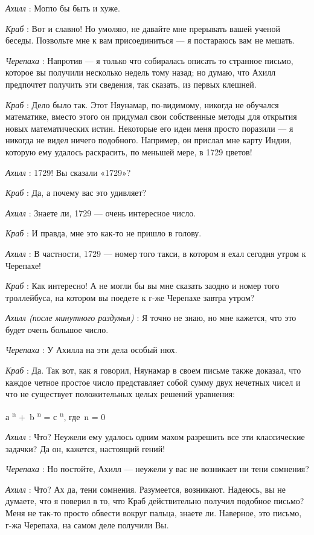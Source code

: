 \documentclass[../main.tex]{subfiles}
\begin{document}
\begin{dialogue}
\emph{Ахилл} : Могло бы быть и хуже.

\emph{Краб} : Вот и славно! Но умоляю, не давайте мне прерывать вашей ученой беседы. Позвольте мне к вам присоединиться --- я постараюсь вам не мешать.

\emph{Черепаха} : Напротив --- я только что собиралась описать то странное письмо, которое вы получили несколько недель тому назад; но думаю, что Ахилл предпочтет получить эти сведения, так сказать, из первых клешней.

\emph{Краб} : Дело было так. Этот Няунамар, по-видимому, никогда не обучался математике, вместо этого он придумал свои собственные методы для открытия новых математических истин. Некоторые его идеи меня просто поразили --- я никогда не видел ничего подобного. Например, он прислал мне карту Индии, которую ему удалось раскрасить, по меньшей мере, в 1729 цветов!

\emph{Ахилл} : 1729! Вы сказали «1729»?

\emph{Краб} : Да, а почему вас это удивляет?

\emph{Ахилл} : Знаете ли, 1729 --- очень интересное число.

\emph{Краб} : И правда, мне это как-то не пришло в голову.

\emph{Ахилл} : В частности, 1729 --- номер того такси, в котором я ехал сегодня утром к Черепахе!

\emph{Краб} : Как интересно! А не могли бы вы мне сказать заодно и номер того троллейбуса, на котором вы поедете к г-же Черепахе завтра утром?

\emph{Ахилл (после минутного раздумья)} : Я точно не знаю, но мне кажется, что это будет очень большое число.

\emph{Черепаха} : У Ахилла на эти дела особый нюх.

\emph{Краб} : Да. Так вот, как я говорил, Няунамар в своем письме также доказал, что каждое четное простое число представляет собой сумму двух нечетных чисел и что не существует положительных целых решений уравнения:

а \textsuperscript{n} +~b \textsuperscript{n} = с \textsuperscript{n}, где~n = 0

\emph{Ахилл} : Что? Неужели ему удалось одним махом разрешить все эти классические задачки? Да он, кажется, настоящий гений!

\emph{Черепаха} : Но постойте, Ахилл --- неужели у вас не возникает ни тени сомнения?

\emph{Ахилл} : Что? Ах да, тени сомнения. Разумеется, возникают. Надеюсь, вы не думаете, что я поверил в то, что Краб действительно получил подобное письмо? Меня не так-то просто обвести вокруг пальца, знаете ли. Наверное, это письмо, г-жа Черепаха, на самом деле получили Вы.


\end{dialogue}
\end{document}
